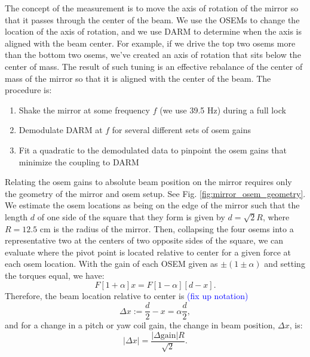 The concept of the measurement is to move the axis of rotation of the
mirror so that it passes through the center of the beam. We use the
OSEMs to change the location of the axis of rotation, and we use DARM
to determine when the axis is aligned with the beam center. For
example, if we drive the top two osems more than the bottom two osems,
we've created an axis of rotation that sits below the center of
mass. The result of such tuning is an effective rebalance of the
center of mass of the mirror so that it is aligned with the center of
the beam. The procedure is:
\begin{enumerate}
\item Shake the mirror at some frequency $f$ (we use
39.5 Hz) during a full lock \vspace{-10pt}
\item Demodulate DARM at $f$ for several different sets of osem gains \vspace{-10pt}
\item Fit a quadratic to the demodulated data to pinpoint the osem gains that
  minimize the coupling to DARM
\end{enumerate}

Relating the osem gains to absolute beam position on the mirror
requires only the geometry of the mirror and osem setup. See
Fig. \ref{fig:mirror_osem_geometry}. We estimate the osem locations as
being on the edge of the mirror such that the length $d$ of one side
of the square that they form is given by $d =\sqrt{2} R$, where $R =
12.5$ cm is the radius of the mirror.  Then, collapsing the four osems
into a representative two at the centers of two opposite sides of the
square, we can evaluate where the pivot point is located relative to
center for a given force at each osem location. With the gain of each
OSEM given as $\pm (1 \pm \alpha)$ and setting the torques equal, we
have:
\begin{equation}
F [1+\alpha] x = F [1-\alpha][d-x].
\end{equation}
Therefore, the beam location relative to center is
\textcolor{blue}{(fix up notation)}
\begin{equation}
\Delta x := \frac{d}{2} - x = \alpha \frac{d}{2},
\end{equation}
and for a change in a pitch or yaw coil gain, the change in beam
position, $\Delta x$, is:
\begin{equation}
|\Delta{x}| = \frac{|\Delta{\mbox{gain}}| R}{\sqrt{2}} .
\end{equation}

